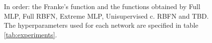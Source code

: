 \documentclass[a4paper]{article}
\numberwithin{equation}{section} %
\numberwithin{figure}{section} %
\numberwithin{table}{section} %
\theoremstyle{definition}
\begin{document}
\begin{figure}[H]
\begin{subfigure}{.32\textwidth}
	\end{subfigure}
	\caption{In order: the Franke's function and the functions obtained by
		Full MLP, Full RBFN, Extreme MLP, Unisupervised c. RBFN and TBD.
		The hyperparameters used for each network are specified in table
		\ref{tab:experiments}.}
	\label{fig:plots}
\end{figure}


%
%

\end{document}
